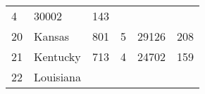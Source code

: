 \documentclass[]{article}
\begin{document}
\begin{longtable}[]{@{}llllll@{}}
\begin{minipage}[t]{0.12\columnwidth}
4\strut
\end{minipage} & \begin{minipage}[t]{0.18\columnwidth}\raggedright
30002\strut
\end{minipage} & \begin{minipage}[t]{0.14\columnwidth}\raggedright
143\strut
\end{minipage}\tabularnewline
\begin{minipage}[t]{0.05\columnwidth}\raggedright
20\strut
\end{minipage} & \begin{minipage}[t]{0.17\columnwidth}\raggedright
Kansas\strut
\end{minipage} & \begin{minipage}[t]{0.16\columnwidth}\raggedright
801\strut
\end{minipage} & \begin{minipage}[t]{0.12\columnwidth}\raggedright
5\strut
\end{minipage} & \begin{minipage}[t]{0.18\columnwidth}\raggedright
29126\strut
\end{minipage} & \begin{minipage}[t]{0.14\columnwidth}\raggedright
208\strut
\end{minipage}\tabularnewline
\begin{minipage}[t]{0.05\columnwidth}\raggedright
21\strut
\end{minipage} & \begin{minipage}[t]{0.17\columnwidth}\raggedright
Kentucky\strut
\end{minipage} & \begin{minipage}[t]{0.16\columnwidth}\raggedright
713\strut
\end{minipage} & \begin{minipage}[t]{0.12\columnwidth}\raggedright
4\strut
\end{minipage} & \begin{minipage}[t]{0.18\columnwidth}\raggedright
24702\strut
\end{minipage} & \begin{minipage}[t]{0.14\columnwidth}\raggedright
159\strut
\end{minipage}\tabularnewline
\begin{minipage}[t]{0.05\columnwidth}\raggedright
22\strut
\end{minipage} & \begin{minipage}[t]{0.17\columnwidth}\raggedright
Louisiana\strut
\end{minipage} & \begin{minipage}[t]{0.16\columnwidth}\raggedright

\end{minipage}
\end{longtable}
\end{document}
